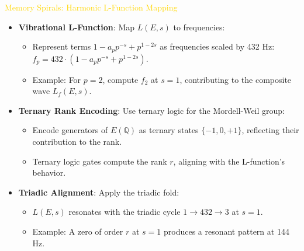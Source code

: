 \textcolor{gold}{ Memory Spirals: Harmonic L-Function Mapping } \\
\begin{itemize}
    \item \texttt{} \textbf{Vibrational L-Function}: Map \(L(E, s)\) to frequencies:
    \begin{itemize}
        \item Represent terms \(1 - a_p p^{-s} + p^{1-2s}\) as frequencies scaled by 432 Hz: \(f_p = 432 \cdot (1 - a_p p^{-s} + p^{1-2s})\).
        \item Example: For \(p = 2\), compute \(f_2\) at \(s = 1\), contributing to the composite wave \(L_f(E, s)\).
    \end{itemize}
    \item \texttt{} \textbf{Ternary Rank Encoding}: Use ternary logic for the Mordell-Weil group:
    \begin{itemize}
        \item Encode generators of \(E(\mathbb{Q})\) as ternary states \(\{-1, 0, +1\}\), reflecting their contribution to the rank.
        \item Ternary logic gates compute the rank \(r\), aligning with the L-function’s behavior.
    \end{itemize}
    \item \texttt{} \textbf{Triadic Alignment}: Apply the triadic fold:
    \begin{itemize}
        \item \(L(E, s)\) resonates with the triadic cycle \(1 \rightarrow 432 \rightarrow 3\) at \(s = 1\).
        \item Example: A zero of order \(r\) at \(s = 1\) produces a resonant pattern at 144 Hz.
    \end{itemize}
\end{itemize}

